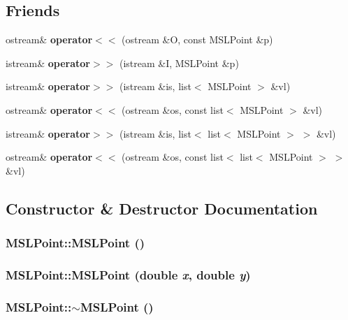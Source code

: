 \subsection*{Friends}
\begin{CompactItemize}
\item 
ostream\& {\bf operator$<$$<$} (ostream \&O, const MSLPoint \&p)
\item 
istream\& {\bf operator$>$$>$} (istream \&I, MSLPoint \&p)
\item 
istream\& {\bf operator$>$$>$} (istream \&is, list$<$ MSLPoint $>$ \&vl)
\item 
ostream\& {\bf operator$<$$<$} (ostream \&os, const list$<$ MSLPoint $>$ \&vl)
\item 
istream\& {\bf operator$>$$>$} (istream \&is, list$<$ list$<$ MSLPoint $>$ $>$ \&vl)
\item 
ostream\& {\bf operator$<$$<$} (ostream \&os, const list$<$ list$<$ MSLPoint $>$ $>$ \&vl)
\end{CompactItemize}


\subsection{Constructor \& Destructor Documentation}
\subsubsection{\setlength{\rightskip}{0pt plus 5cm}MSLPoint::MSLPoint ()}\label{class_MSLPoint_a0}


\subsubsection{\setlength{\rightskip}{0pt plus 5cm}MSLPoint::MSLPoint (double {\em x}, double {\em y})}\label{class_MSLPoint_a1}


\subsubsection{\setlength{\rightskip}{0pt plus 5cm}MSLPoint::$\sim$MSLPoint ()\hspace{0.3cm}{\tt  [inline]}}\label{class_MSLPoint_a2}




